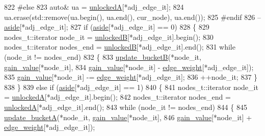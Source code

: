 \begin{DoxyCode}
822 \textcolor{preprocessor}{#else}
823         \textcolor{keyword}{auto}& ua = \mbox{\hyperlink{classfm__partition_a9d75a1d63f711a0c66ae7f5bc181cd8b}{unlockedA}}[*adj\_edge\_it];
824         ua.erase(std::remove(ua.begin(), ua.end(), cur\_node), ua.end());
825 \textcolor{preprocessor}{#endif}
826     --\mbox{\hyperlink{classfm__partition_a14b0aa9a91a6e7fa3035669cf5056275}{aside}}[*adj\_edge\_it];
827     \textcolor{keywordflow}{if} (\mbox{\hyperlink{classfm__partition_a14b0aa9a91a6e7fa3035669cf5056275}{aside}}[*adj\_edge\_it] == 0)
828     \{
829         nodes\_t::iterator node\_it = \mbox{\hyperlink{classfm__partition_a74865bf3e6b6f73350c43c3ad9dfda96}{unlockedB}}[*adj\_edge\_it].begin();
830         nodes\_t::iterator nodes\_end = \mbox{\hyperlink{classfm__partition_a74865bf3e6b6f73350c43c3ad9dfda96}{unlockedB}}[*adj\_edge\_it].end();
831         \textcolor{keywordflow}{while} (node\_it != nodes\_end)
832         \{
833         \mbox{\hyperlink{classfm__partition_a270d469ca584ed9adff9fced67743679}{update\_bucketB}}(*node\_it, \mbox{\hyperlink{classfm__partition_ae8176f4ce82305abfd58e519d2cdd91d}{gain\_value}}[*node\_it],
834             \mbox{\hyperlink{classfm__partition_ae8176f4ce82305abfd58e519d2cdd91d}{gain\_value}}[*node\_it] - \mbox{\hyperlink{classfm__partition_adfe6147ba3f9c785f613b472f950595f}{edge\_weight}}[*adj\_edge\_it]);
835         \mbox{\hyperlink{classfm__partition_ae8176f4ce82305abfd58e519d2cdd91d}{gain\_value}}[*node\_it] -= \mbox{\hyperlink{classfm__partition_adfe6147ba3f9c785f613b472f950595f}{edge\_weight}}[*adj\_edge\_it];
836         ++node\_it;
837         \}
838     \}
839     \textcolor{keywordflow}{else} \textcolor{keywordflow}{if} (\mbox{\hyperlink{classfm__partition_a14b0aa9a91a6e7fa3035669cf5056275}{aside}}[*adj\_edge\_it] == 1)
840     \{
841         nodes\_t::iterator node\_it = \mbox{\hyperlink{classfm__partition_a9d75a1d63f711a0c66ae7f5bc181cd8b}{unlockedA}}[*adj\_edge\_it].begin();
842         nodes\_t::iterator nodes\_end = \mbox{\hyperlink{classfm__partition_a9d75a1d63f711a0c66ae7f5bc181cd8b}{unlockedA}}[*adj\_edge\_it].end();
843         \textcolor{keywordflow}{while} (node\_it != nodes\_end)
844         \{
845         \mbox{\hyperlink{classfm__partition_aa4ec83c52916cc6cac23e7a9987427cd}{update\_bucketA}}(*node\_it, \mbox{\hyperlink{classfm__partition_ae8176f4ce82305abfd58e519d2cdd91d}{gain\_value}}[*node\_it],
846             \mbox{\hyperlink{classfm__partition_ae8176f4ce82305abfd58e519d2cdd91d}{gain\_value}}[*node\_it] + \mbox{\hyperlink{classfm__partition_adfe6147ba3f9c785f613b472f950595f}{edge\_weight}}[*adj\_edge\_it]);

\end{DoxyCode}
